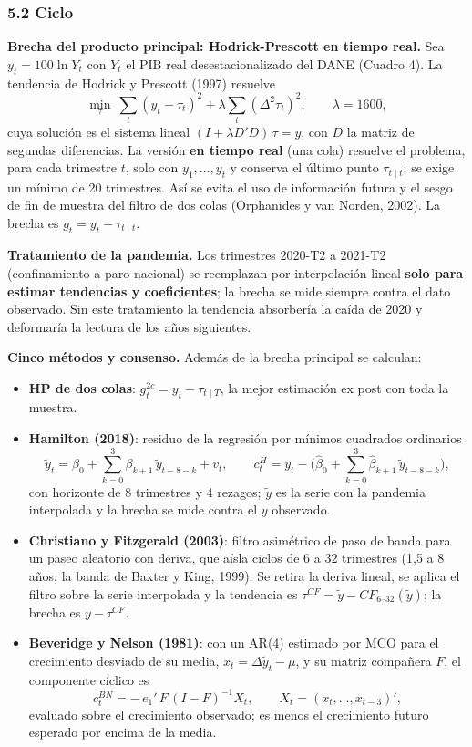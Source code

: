 \hypertarget{ciclo}{%
\subsubsection{5.2 Ciclo}\label{ciclo}}

\textbf{Brecha del producto principal: Hodrick-Prescott en tiempo real.}
Sea \(y_t=100\ln Y_t\) con \(Y_t\) el PIB real desestacionalizado del
DANE (Cuadro 4). La tendencia de Hodrick y Prescott (1997) resuelve
\[\min_{\tau}\ \sum_t (y_t-\tau_t)^2+\lambda\sum_t(\Delta^2\tau_t)^2,\qquad \lambda=1600,\]
cuya solución es el sistema lineal \((I+\lambda D'D)\,\tau = y\), con
\(D\) la matriz de segundas diferencias. La versión \textbf{en tiempo
real} (una cola) resuelve el problema, para cada trimestre \(t\), solo
con \(y_1,\dots,y_t\) y conserva el último punto \(\tau_{t\mid t}\); se
exige un mínimo de 20 trimestres. Así se evita el uso de información
futura y el sesgo de fin de muestra del filtro de dos colas (Orphanides
y van Norden, 2002). La brecha es \(g_t = y_t-\tau_{t\mid t}\).

\textbf{Tratamiento de la pandemia.} Los trimestres 2020-T2 a 2021-T2
(confinamiento a paro nacional) se reemplazan por interpolación lineal
\textbf{solo para estimar tendencias y coeficientes}; la brecha se mide
siempre contra el dato observado. Sin este tratamiento la tendencia
absorbería la caída de 2020 y deformaría la lectura de los años
siguientes.

\textbf{Cinco métodos y consenso.} Además de la brecha principal se
calculan:

\begin{itemize}
\tightlist
\item
  \textbf{HP de dos colas}: \(g^{2c}_t=y_t-\tau_{t\mid T}\), la mejor
  estimación ex post con toda la muestra.
\item
  \textbf{Hamilton (2018)}: residuo de la regresión por mínimos
  cuadrados ordinarios
  \[\tilde y_t = \beta_0+\sum_{k=0}^{3}\beta_{k+1}\,\tilde y_{t-8-k}+v_t,\qquad
  c^{H}_t = y_t-\Big(\hat\beta_0+\sum_{k=0}^{3}\hat\beta_{k+1}\,\tilde y_{t-8-k}\Big),\]
  con horizonte de 8 trimestres y 4 rezagos; \(\tilde y\) es la serie
  con la pandemia interpolada y la brecha se mide contra el \(y\)
  observado.
\item
  \textbf{Christiano y Fitzgerald (2003)}: filtro asimétrico de paso de
  banda para un paseo aleatorio con deriva, que aísla ciclos de 6 a 32
  trimestres (1,5 a 8 años, la banda de Baxter y King, 1999). Se retira
  la deriva lineal, se aplica el filtro sobre la serie interpolada y la
  tendencia es \(\tau^{CF}=\tilde y-CF_{6\text{–}32}(\tilde y)\); la
  brecha es \(y-\tau^{CF}\).
\item
  \textbf{Beveridge y Nelson (1981)}: con un AR(4) estimado por MCO para
  el crecimiento desviado de su media, \(x_t=\Delta\tilde y_t-\mu\), y
  su matriz compañera \(F\), el componente cíclico es
  \[c^{BN}_t = -\,e_1'\,F\,(I-F)^{-1}X_t,\qquad X_t=(x_t,\dots,x_{t-3})',\]
  evaluado sobre el crecimiento observado; es menos el crecimiento
  futuro esperado por encima de la media.
\end{itemize}

